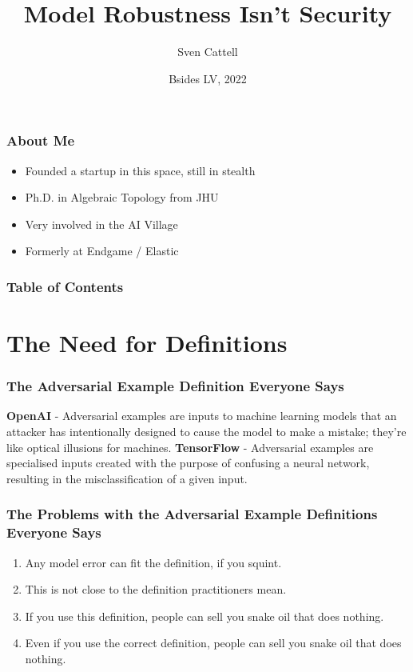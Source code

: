 \documentclass{beamer}
\title{Model Robustness Isn’t Security}
\author{Sven Cattell}
\date{Bsides LV, 2022}
\begin{document}
\frame{\titlepage}
\begin{frame}
\frametitle{About Me}
\begin{itemize}
\item Founded a startup in this space, still in stealth
\item Ph.D. in Algebraic Topology from JHU
\item Very involved in the AI Village
\item Formerly at Endgame / Elastic
\end{itemize}
\end{frame}

\begin{frame}
\frametitle{Table of Contents}
\tableofcontents
\end{frame}

\section{The Need for Definitions}

\begin{frame}
    \frametitle{The Adversarial Example Definition Everyone Says}
    \textbf{OpenAI} - Adversarial examples are inputs to machine learning models that an attacker has intentionally designed to cause the model to make a mistake; they're like optical illusions for machines.
    \newline
    \newline
    \textbf{TensorFlow} - Adversarial examples are specialised inputs created with the purpose of confusing a neural network, resulting in the misclassification of a given input.
\end{frame}

\begin{frame}
    \frametitle{The Problems with the Adversarial Example Definitions Everyone Says}
    \begin{enumerate}
        \item Any model error can fit the definition, if you squint.
        \item This is not close to the definition practitioners mean.
        \item If you use this definition, people can sell you snake oil that does nothing.
        \item Even if you use the correct definition, people can sell you snake oil that does nothing.
    \end{enumerate}
\end{frame}
\end{document}
